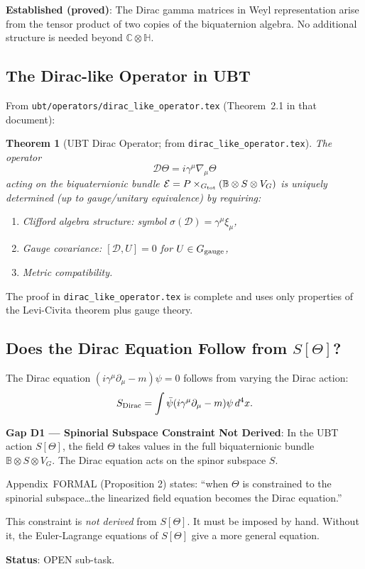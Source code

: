 \documentclass[12pt]{article}
\newtheorem{theorem}{Theorem}[section]
\theoremstyle{definition}
\theoremstyle{remark}
\begin{document}
\begin{resultbox}
\textbf{Established (proved)}: The Dirac gamma matrices in Weyl representation arise from
the tensor product of two copies of the biquaternion algebra.  No additional structure is
needed beyond $\mathbb{C}\otimes\mathbb{H}$.
\end{resultbox}

\subsection{The Dirac-like Operator in UBT}

From \texttt{ubt/operators/dirac\_like\_operator.tex} (Theorem~2.1 in that document):

\begin{theorem}[UBT Dirac Operator; from \texttt{dirac\_like\_operator.tex}]
The operator
\[
  \mathcal{D}\Theta = i\gamma^\mu\nabla_\mu\Theta
\]
acting on the biquaternionic bundle $\mathcal{E} = P\times_{G_{\rm tot}}(\mathbb{B}\otimes S\otimes V_G)$
is uniquely determined (up to gauge/unitary equivalence) by requiring:
\begin{enumerate}
  \item Clifford algebra structure: symbol $\sigma(\mathcal{D})=\gamma^\mu\xi_\mu$,
  \item Gauge covariance: $[\mathcal{D}, U]=0$ for $U\in G_{\rm gauge}$,
  \item Metric compatibility.
\end{enumerate}
\end{theorem}

The proof in \texttt{dirac\_like\_operator.tex} is complete and uses only properties of
the Levi-Civita theorem plus gauge theory.

\subsection{Does the Dirac Equation Follow from $S[\Theta]$?}

The Dirac equation $(i\gamma^\mu\partial_\mu - m)\psi = 0$ follows from varying the
Dirac action:
\begin{equation}
  S_{\rm Dirac} = \int\bar\psi(i\gamma^\mu\partial_\mu - m)\psi\,d^4x.
\end{equation}

\begin{gapbox}
\textbf{Gap D1 — Spinorial Subspace Constraint Not Derived}:
In the UBT action $S[\Theta]$, the field $\Theta$ takes values in the full biquaternionic
bundle $\mathbb{B}\otimes S\otimes V_G$.  The Dirac equation acts on the spinor subspace $S$.

Appendix~FORMAL (Proposition 2) states: ``when $\Theta$ is constrained to the spinorial
subspace\ldots the linearized field equation becomes the Dirac equation.''

This constraint is \emph{not derived} from $S[\Theta]$.  It must be imposed by hand.
Without it, the Euler-Lagrange equations of $S[\Theta]$ give a more general equation.

\textbf{Status}: OPEN sub-task.
\end{gapbox}
\end{document}
